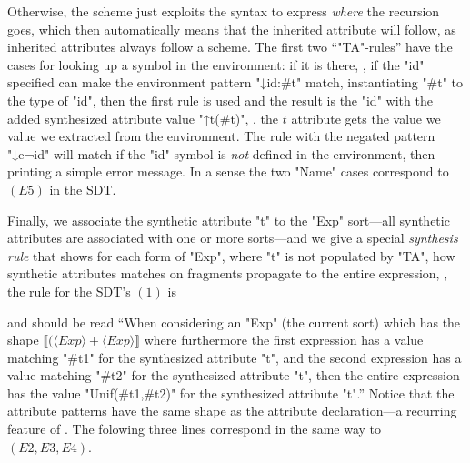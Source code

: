 \documentclass[11pt]{article} %
\begin{document}
\begin{example}
  Otherwise, the scheme just exploits the syntax to express \emph{where} the recursion goes, which
  then automatically means that the inherited attribute will follow, as \HAX inherited attributes
  always follow a scheme.  The first two ``"TA"-rules'' have the cases for looking up a symbol in
  the environment: if it is there, \ie, if the "id" specified can make the environment pattern
  "↓{id:#t}" match, instantiating "#t" to the type of "id", then the first rule is used and the
  result is the "id" with the added synthesized attribute value "↑t(#t)", \ie, the $t$ attribute
  gets the value we value we extracted from the environment. The rule with the negated pattern
  "↓e{¬id}" will match if the "id" symbol is \emph{not} defined in the environment, then printing a
  simple error message.  In a sense the two "Name" cases correspond to $(E5)$ in the SDT.

  Finally, we associate the synthetic attribute "t" to the "Exp" sort---all synthetic attributes are
  associated with one or more sorts---and we give a special \emph{synthesis rule} that shows for
  each form of "Exp", where "t" is not populated by "TA", how synthetic attributes matches on
  fragments propagate to the entire expression, \eg, the rule for the SDT's $(1)$ is
  and should be read ``When considering an "Exp" (the current sort) which has the shape
  $⟦(⟨Exp⟩+⟨Exp⟩⟧$ where furthermore the first expression has a value matching "#t1" for the
  synthesized attribute "t", and the second expression has a value matching "#t2" for the
  synthesized attribute "t", then the entire expression has the value "Unif(#t1,#t2)" for the
  synthesized attribute "t".''  Notice that the attribute patterns have the same shape as the
  attribute declaration---a recurring feature of \HAX. The folowing three lines correspond in the
  same way to $(E2,E3,E4)$.
\end{example}
\end{document}
